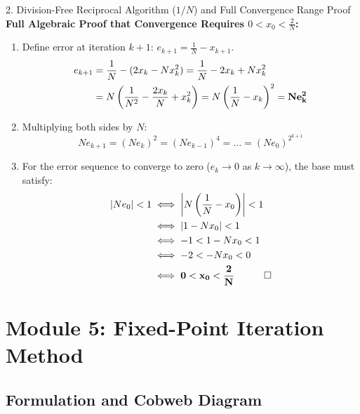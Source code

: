 \documentclass[11pt,a4paper]{article}
\begin{document}
\begin{formulabox}{\texorpdfstring{2. Division-Free Reciprocal Algorithm ($1/N$) and Full Convergence Range Proof}{2. Division-Free Reciprocal Algorithm (1/N) and Full Convergence Range Proof}}
\textbf{Full Algebraic Proof that Convergence Requires $0 < x_0 < \frac{2}{N}$:}
\begin{enumerate}
    \item Define error at iteration $k+1$: $e_{k+1} = \frac{1}{N} - x_{k+1}$.
    \begin{align}
        e_{k+1} &= \frac{1}{N} - (2x_k - N x_k^2) = \frac{1}{N} - 2x_k + N x_k^2 \notag \\
        &= N \left( \frac{1}{N^2} - \frac{2x_k}{N} + x_k^2 \right) = N \left( \frac{1}{N} - x_k \right)^2 = \mathbf{N e_k^2}
    \end{align}
    \item Multiplying both sides by $N$:
    \begin{equation}
        N e_{k+1} = (N e_k)^2 = (N e_{k-1})^4 = \dots = (N e_0)^{2^{k+1}}
    \end{equation}
    \item For the error sequence to converge to zero ($e_k \to 0$ as $k \to \infty$), the base must satisfy:
    \begin{align}
        |N e_0| < 1 &\iff \left| N \left(\frac{1}{N} - x_0\right) \right| < 1 \notag \\
        &\iff |1 - N x_0| < 1 \notag \\
        &\iff -1 < 1 - N x_0 < 1 \notag \\
        &\iff -2 < -N x_0 < 0 \notag \\
        &\iff \mathbf{0 < x_0 < \frac{2}{N}} \quad \qed
    \end{align}
\end{enumerate}
\end{formulabox}

\newpage

\section{Module 5: Fixed-Point Iteration Method}

\subsection{Formulation and Cobweb Diagram}

\begin{center}
\end{center}
\end{document}
